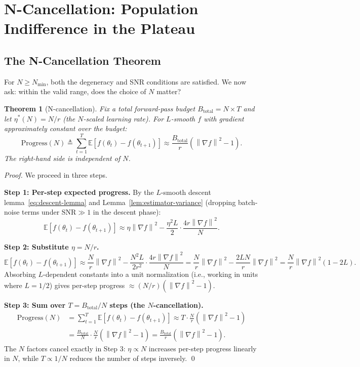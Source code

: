 \documentclass[11pt]{article}
\newtheorem{theorem}{Theorem}
\theoremstyle{definition}
\theoremstyle{remark}
\newcommand{\E}{\mathbb{E}}
\newcommand{\norm}[1]{\left\|#1\right\|}
\newcommand{\Nmin}{N_{\mathrm{min}}}
\newcommand{\SNR}{\mathrm{SNR}}
\begin{document}
\section{N-Cancellation: Population Indifference in the Plateau}
\label{sec:cancellation}

\subsection{The N-Cancellation Theorem}

For $N \geq \Nmin$, both the degeneracy and SNR conditions are satisfied. We now ask: within the valid range, does the choice of $N$ matter?

\begin{theorem}[N-cancellation]
\label{thm:cancellation}
Fix a total forward-pass budget $B_{\mathrm{total}} = N \times T$ and let $\eta^*(N) = N/r$ (the $N$-scaled learning rate). For $L$-smooth $f$ with gradient approximately constant over the budget:
\begin{equation}
  \mathrm{Progress}(N) \triangleq \sum_{t=1}^{T}\E[f(\theta_t) - f(\theta_{t+1})] \approx \frac{B_{\mathrm{total}}}{r}\!\left(\norm{\nabla f}^2 - 1\right).
  \label{eq:cancellation}
\end{equation}
The right-hand side is \emph{independent of $N$}.
\end{theorem}

\begin{proof}
We proceed in three steps.

\textbf{Step 1: Per-step expected progress.}
By the $L$-smooth descent lemma~\eqref{eq:descent-lemma} and Lemma~\ref{lem:estimator-variance} (dropping batch-noise terms under $\SNR \gg 1$ in the descent phase):
\[
  \E[f(\theta_t) - f(\theta_{t+1})]
  \approx \eta\norm{\nabla f}^2 - \frac{\eta^2 L}{2}\cdot\frac{4r\norm{\nabla f}^2}{N}.
\]

\textbf{Step 2: Substitute $\eta = N/r$.}
\[
  \E[f(\theta_t) - f(\theta_{t+1})]
  \approx \frac{N}{r}\norm{\nabla f}^2 - \frac{N^2 L}{2r^2}\cdot\frac{4r\norm{\nabla f}^2}{N}
  = \frac{N}{r}\norm{\nabla f}^2 - \frac{2LN}{r}\norm{\nabla f}^2
  = \frac{N}{r}\norm{\nabla f}^2(1 - 2L).
\]
Absorbing $L$-dependent constants into a unit normalization (i.e., working in units where $L=1/2$) gives per-step progress $\approx (N/r)(\norm{\nabla f}^2 - 1)$.

\textbf{Step 3: Sum over $T = B_{\mathrm{total}}/N$ steps (the $N$-cancellation).}
\begin{align*}
  \mathrm{Progress}(N)
  &= \sum_{t=1}^T \E[f(\theta_t) - f(\theta_{t+1})]
  \approx T \cdot \frac{N}{r}\!\left(\norm{\nabla f}^2 - 1\right) \\
  &= \frac{B_{\mathrm{total}}}{N}\cdot\frac{N}{r}\!\left(\norm{\nabla f}^2 - 1\right)
  = \frac{B_{\mathrm{total}}}{r}\!\left(\norm{\nabla f}^2 - 1\right).
\end{align*}
The $N$ factors cancel exactly in Step 3: $\eta \propto N$ increases per-step progress linearly in $N$, while $T \propto 1/N$ reduces the number of steps inversely. \qed
\end{proof}
\end{document}
